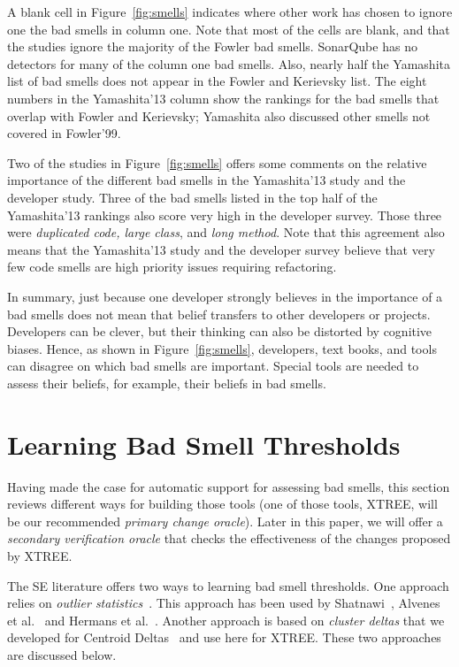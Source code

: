 \documentclass[twocolumn,5p]{elsarticle}
\newcommand{\fig}[1]{Figure~\ref{fig:#1}}
\theoremstyle{break}
\begin{document}
   
   


A  blank cell in \fig{smells}
indicates where   other work has chosen to ignore
one the   bad smells in column one. 
Note that most of the cells are blank, and that the studies ignore the majority of the Fowler bad smells.
SonarQube has no detectors for many of the column one bad smells.
Also, nearly half the Yamashita list of bad smells
    does not appear in the Fowler and Kerievsky list. The eight numbers
    in the  Yamashita'13 column show the rankings for the bad smells 
    that overlap with Fowler and Kerievsky; Yamashita also discussed other smells not covered in Fowler'99.
    

Two of the studies in \fig{smells} offers some comments on the relative importance
of the different bad smells in the Yamashita'13 study and the developer study. Three of the bad smells listed in the top half of the Yamashita'13 rankings also score very high in the developer survey. Those three were {\em duplicated code, large class}, 
        and {\em long method}. 
 Note that this agreement also means that the
  Yamashita'13 study and the developer survey   
  believe
        that very few  code smells are   high priority issues
        requiring refactoring. 
        
In summary, just because one developer strongly believes in the importance of a bad smells does not mean that belief transfers to other developers or projects.
Developers can be clever, but their thinking can also be distorted
by cognitive biases.
Hence, as shown in \fig{smells}, developers, text books, and tools 
can disagree on which bad smells are important.
Special tools are needed to assess their beliefs, for example, their beliefs in
bad smells.  
 

\section{Learning Bad Smell Thresholds}\label{sect:bst}

Having made the case for automatic support for assessing bad smells,
this section reviews different ways for building those tools (one of those tools,
XTREE, will be our recommended {\em primary change oracle}).
Later in this paper, we will offer  a {\em secondary verification oracle}
that checks the effectiveness of the changes proposed by XTREE.

The SE literature offers  two ways to 
learning bad smell thresholds.
One approach relies on 
{\em outlier statistics}~\cite{erni96,bender99}. This approach
has been used   by Shatnawi~\cite{Shatnawi10}, Alvenes et al.~\cite{Alves2010}
    and Hermans et al.~\cite{hermans15}.
    Another approach is 
    based on {\em cluster deltas} that we developed
    for   Centroid Deltas~\cite{me12c} and 
    use here for XTREE. 
    These two approaches are discussed below. 
\end{document}
